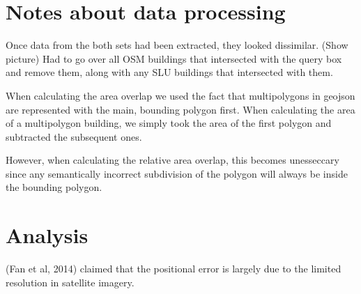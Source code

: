\documentclass[a4paper]{article}
\begin{document}
\section{Notes about data processing}

Once data from the both sets had been extracted, they looked dissimilar. (Show picture) Had to go over all OSM buildings that intersected with the query box and remove them, along with any SLU buildings that intersected with them.

When calculating the area overlap we used the fact that multipolygons in geojson are represented with the main, bounding polygon first. When calculating the area of a multipolygon building, we simply took the area of the first polygon and subtracted the subsequent ones.

However, when calculating the relative area overlap, this becomes unesseccary since any semantically incorrect subdivision of the polygon will always be inside the bounding polygon.

\section{Analysis}

(Fan et al, 2014) claimed that the positional error is largely due to the limited resolution in satellite imagery.
\end{document}
